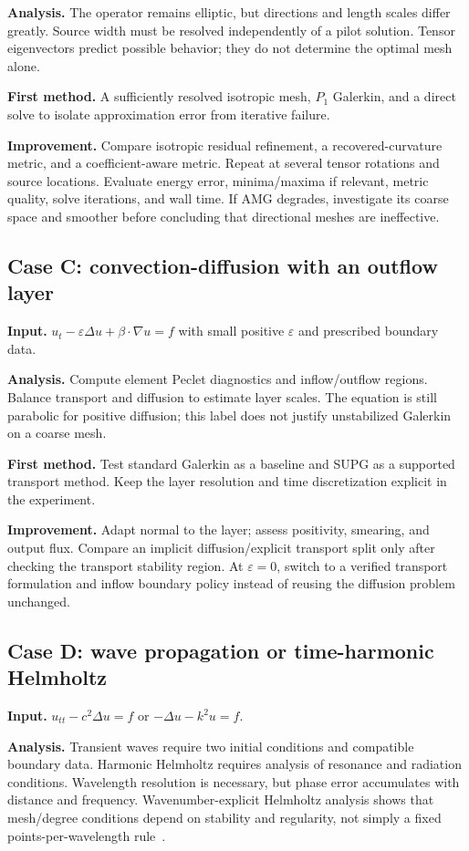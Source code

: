 \documentclass[11pt,a4paper]{article}
\begin{document}
\textbf{Analysis.} The operator remains elliptic, but directions and length scales differ greatly. Source width must be resolved independently of a pilot solution. Tensor eigenvectors predict possible behavior; they do not determine the optimal mesh alone.

\textbf{First method.} A sufficiently resolved isotropic mesh, $P_1$ Galerkin, and a direct solve to isolate approximation error from iterative failure.

\textbf{Improvement.} Compare isotropic residual refinement, a recovered-curvature metric, and a coefficient-aware metric. Repeat at several tensor rotations and source locations. Evaluate energy error, minima/maxima if relevant, metric quality, solve iterations, and wall time. If AMG degrades, investigate its coarse space and smoother before concluding that directional meshes are ineffective.

\subsection{Case C: convection-diffusion with an outflow layer}
\textbf{Input.} $u_t-\varepsilon\Delta u+\beta\cdot\nabla u=f$ with small positive $\varepsilon$ and prescribed boundary data.

\textbf{Analysis.} Compute element Peclet diagnostics and inflow/outflow regions. Balance transport and diffusion to estimate layer scales. The equation is still parabolic for positive diffusion; this label does not justify unstabilized Galerkin on a coarse mesh.

\textbf{First method.} Test standard Galerkin as a baseline and SUPG as a supported transport method. Keep the layer resolution and time discretization explicit in the experiment.

\textbf{Improvement.} Adapt normal to the layer; assess positivity, smearing, and output flux. Compare an implicit diffusion/explicit transport split only after checking the transport stability region. At $\varepsilon=0$, switch to a verified transport formulation and inflow boundary policy instead of reusing the diffusion problem unchanged.

\subsection{Case D: wave propagation or time-harmonic Helmholtz}
\textbf{Input.} $u_{tt}-c^2\Delta u=f$ or $-\Delta u-k^2u=f$.

\textbf{Analysis.} Transient waves require two initial conditions and compatible boundary data. Harmonic Helmholtz requires analysis of resonance and radiation conditions. Wavelength resolution is necessary, but phase error accumulates with distance and frequency. Wavenumber-explicit Helmholtz analysis shows that mesh/degree conditions depend on stability and regularity, not simply a fixed points-per-wavelength rule~\cite{melenk}.
\end{document}
